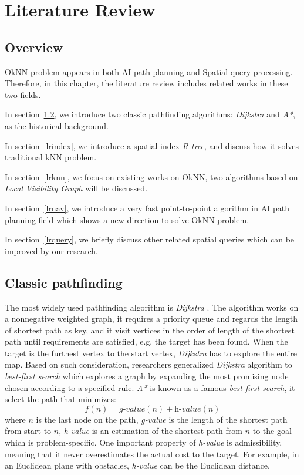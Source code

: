 \chapter{Literature Review}\label{lreview}
\section{Overview}\label{lroverview}
OkNN problem appears in both AI path planning and Spatial query processing.
Therefore, in this chapter, the literature review includes related works in these two fields.

In section~\ref{lrai}, we introduce two classic pathfinding algorithms:
\textit{Dijkstra} and \textit{A*}, as the historical background.

In section~\ref{lrindex}, we introduce a spatial index \textit{R-tree},
and discuss how it solves traditional kNN problem.

In section~\ref{lrknn}, we focus on existing works on OkNN, two algorithms based on
\textit{Local Visibility Graph} will be discussed. 

In section~\ref{lrnav}, we introduce a very fast point-to-point algorithm in AI path planning
field which shows a new direction to solve OkNN problem.

In section~\ref{lrquery}, we briefly discuss other related spatial queries which can be
improved by our research.

\section{Classic pathfinding}\label{lrai}
The most widely used pathfinding algorithm is \textit{Dijkstra} \cite{dijkstra1959note}. 
The algorithm works on a nonnegative weighted graph, it requires a priority queue and
regards the length of shortest path as key, and it visit vertices in the order
of length of the shortest path until requirements are satisfied, e.g. the target has been found.
When the target is the furthest vertex to the start vertex, \textit{Dijkstra} has to explore the entire
map. Based on such consideration, researchers generalized \textit{Dijkstra} algorithm to
\textit{best-first search} which explores a graph by expanding the most promising node chosen
according to a specified rule.
\textit{A*} \cite{hart1968formal} is known as a famous \textit{best-first search},
it select the path that minimizes:
$$
f(n) = \textit{g-value}(n) + \textit{h-value}(n)
$$
where $n$ is the last node on the path, \textit{g-value} is the length of the shortest path from start to
$n$, \textit{h-value} is an estimation of the shortest path from $n$ to the goal which is
problem-specific. One important property of \textit{h-value} is admissibility, meaning that it never
overestimates the actual cost to the target.
For example, in an Euclidean plane with obstacles, \textit{h-value} can be the Euclidean
distance.

